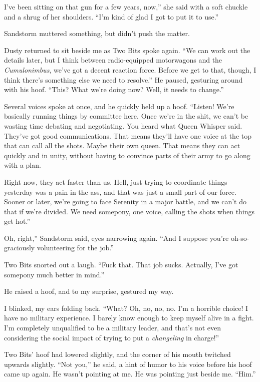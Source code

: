 \leavevmode{}I’ve been sitting on that gun for a few years, now,” she said with a soft chuckle and a shrug of her shoulders. “I’m kind of glad I got to put it to use.”

Sandstorm muttered something, but didn’t push the matter.

Dusty returned to sit beside me as Two Bits spoke again. “We can work out the details later, but I think between radio-equipped motorwagons and the \textit{Cumulonimbus}, we’ve got a decent reaction force. Before we get to that, though, I think there’s something else we need to resolve.” He paused, gesturing around with his hoof. “This? What we’re doing now? Well, it needs to change.”

Several voices spoke at once, and he quickly held up a hoof. “Listen! We’re basically running things by committee here. Once we’re in the shit, we can’t be wasting time debating and negotiating. You heard what Queen Whisper said. They’ve got good communications. That means they’ll have one voice at the top that can call all the shots. Maybe their own queen. That means they can act quickly and in unity, without having to convince parts of their army to go along with a plan.

\leavevmode{}Right now, they act faster than us. Hell, just trying to coordinate things yesterday was a pain in the ass, and that was just a small part of our force. Sooner or later, we’re going to face Serenity in a major battle, and we can’t do that if we’re divided. We need somepony, one voice, calling the shots when things get hot.”

\leavevmode{}Oh, right,” Sandstorm said, eyes narrowing again. “And I suppose you’re oh-so-graciously volunteering for the job.”

Two Bits snorted out a laugh. “Fuck that. That job sucks. Actually, I’ve got somepony much better in mind.”

He raised a hoof, and to my surprise, gestured my way.

I blinked, my ears folding back. “What? Oh, no, no, no. I’m a horrible choice! I have no military experience. I barely know enough to keep myself alive in a fight. I’m completely unqualified to be a military leader, and that’s not even considering the social impact of trying to put a \textit{changeling} in charge!”

Two Bits’ hoof had lowered slightly, and the corner of his mouth twitched upwards slightly. “Not you,” he said, a hint of humor to his voice before his hoof came up again. He wasn’t pointing at me. He was pointing just beside me. “Him.”

